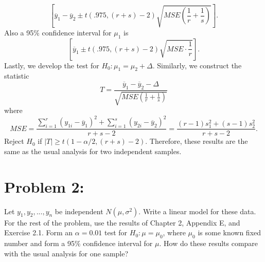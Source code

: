 \documentclass[11pt]{article}
\begin{document}
\begin{itemize}
\[
\left[\overline{y}_1-\overline{y}_2\pm t(.975, (r+s)-2)\sqrt{MSE\left(\frac{1}{r}+\frac{1}{s}\right)} \right].
\]
Also a 95$\%$ confidence interval for $\mu_1$ is
\[
\left[\overline{y}_1 \pm t(.975,(r+s)-2)\sqrt{MSE\cdot\frac{1}{r}} \right].
\]
Lastly, we develop the test for $H_0\colon \mu_1 = \mu_2 + \Delta$.  Similarly, we construct the statistic
\[
T = \frac{\overline{y}_1 - \overline{y}_2 - \Delta}{\sqrt{MSE\left(\frac{1}{r}+\frac{1}{s}\right)}}
\]
where
\[
MSE = \frac{\sum_{i=1}^r(y_{1i}-\overline{y}_1)^2+\sum_{i=1}^s(y_{2i}-\overline{y}_2)^2}{r+s-2} = \frac{(r-1)s_1^2 + (s-1)s^2_2}{r+s-2}.
\]
Reject $H_0$ if $|T| \geq t(1-\alpha/2, (r+s)-2)$.  Therefore, these results are the same as the usual analysis for two independent samples.
\end{itemize}

\section*{Problem 2:}
Let $y_1,y_2,...,y_n$ be independent $N(\mu,\sigma^2)$.  Write a linear model for these data.  For the rest of the problem, use the results of Chapter 2, Appendix E, and Exercise 2.1.  Form an $\alpha = 0.01$ test for $H_0\colon \mu = \mu_0$, where $\mu_0$ is some known fixed number and form a 95$\%$ confidence interval for $\mu$.  How do these results compare with the usual analysis for one sample?
\end{document}
